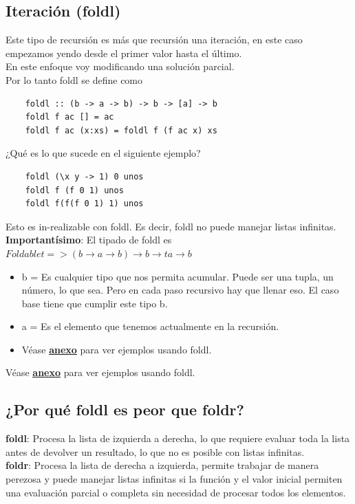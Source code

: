 \documentclass[10pt,a4paper]{article}
\begin{document}
\subsection*{Iteración (foldl)}
Este tipo de recursión es más que recursión una iteración, en este caso empezamos yendo desde el primer valor hasta el último. \\
En este enfoque voy modificando una solución parcial. \\
Por lo tanto foldl se define como
\begin{lstlisting}
    foldl :: (b -> a -> b) -> b -> [a] -> b 
    foldl f ac [] = ac
    foldl f ac (x:xs) = foldl f (f ac x) xs
\end{lstlisting}
¿Qué es lo que sucede en el siguiente ejemplo? \\
\begin{lstlisting}
    foldl (\x y -> 1) 0 unos
    foldl f (f 0 1) unos
    foldl f(f(f 0 1) 1) unos
\end{lstlisting}
Esto es in-realizable con foldl. Es decir, foldl no puede manejar listas infinitas. \\
\textbf{Importantísimo}: El tipado de foldl es $ Foldable t => (b \rightarrow a \rightarrow b) \rightarrow b \rightarrow t a \rightarrow b $
\begin{itemize}
    \item b = Es cualquier tipo que nos permita acumular. Puede ser una tupla, un número, lo que sea. Pero en cada paso recursivo hay que llenar eso. El caso base tiene que cumplir este tipo b.
    \item a = Es el elemento que tenemos actualmente en la recursión.
    \item Véase \hyperref[subsec:foldl_ejercicios]{\underline{\textbf{anexo}}} para ver ejemplos usando foldl.
\end{itemize}
Véase \hyperref[subsec:foldl_ejercicios]{\underline{\textbf{anexo}}} para ver ejemplos usando foldl.
\subsection*{¿Por qué foldl es peor que foldr?}
\textbf{foldl}: Procesa la lista de izquierda a derecha, lo que requiere evaluar toda la lista antes de devolver un resultado, lo que no es posible con listas infinitas. \\
\textbf{foldr}: Procesa la lista de derecha a izquierda, permite trabajar de manera perezosa y puede manejar listas infinitas si la función y el valor inicial permiten una evaluación parcial o completa sin necesidad de procesar todos los elementos.
\end{document}
